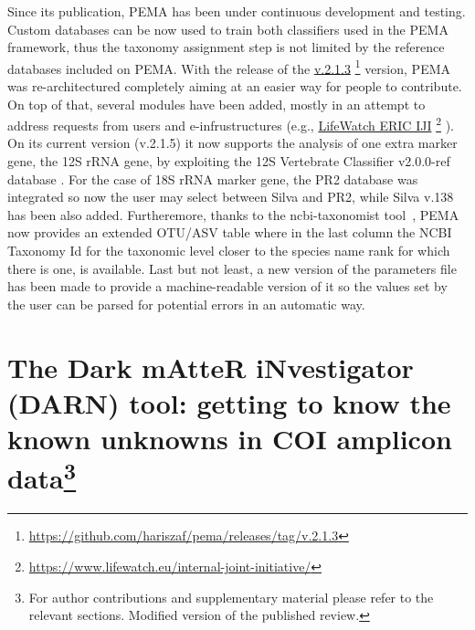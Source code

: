       Since its publication, PEMA has been under continuous development and testing.
      Custom databases can be now used to train both classifiers used in the PEMA framework, thus
      the taxonomy assignment step is not limited by the reference databases included on PEMA.
      With the release of the \href{https://github.com/hariszaf/pema/releases/tag/v.2.1.3}{v.2.1.3}
      \footnote{\href{https://github.com/hariszaf/pema/releases/tag/v.2.1.3}{https://github.com/hariszaf/pema/releases/tag/v.2.1.3}}
      version, PEMA was re-architectured completely aiming at an easier way for people to contribute. 
      On top of that, several modules have been added, mostly in an attempt to address requests from users and
      e-infrustructures (e.g., \href{https://www.lifewatch.eu/internal-joint-initiative/}{LifeWatch ERIC IJI}
      \footnote{\href{https://www.lifewatch.eu/internal-joint-initiative/}{https://www.lifewatch.eu/internal-joint-initiative/}}
      ). 
      On its current version (v.2.1.5) it now supports the analysis of one extra
      marker gene, the 12S rRNA gene, by exploiting the 12S Vertebrate Classifier v2.0.0-ref database \citep{teresita_m_porter_2021_5157047}.
      For the case of 18S rRNA marker gene, the PR2 database \citep{guillou2012protist} was integrated 
      so now the user may select between Silva and PR2,
      while Silva v.138 has been also added. 
      Furtheremore, thanks to the ncbi-taxonomist tool~\citep{buchmann2020collecting}, 
      PEMA now provides an extended OTU/ASV table where in the last column the NCBI Taxonomy Id 
      for the taxonomic level closer to the species name rank for which there is one, is available.
      Last but not least, a new version of the parameters file has been made to provide a machine-readable version 
      of it so the values set by the user can be parsed for potential errors in an automatic way. 


   \newpage


% 
% 

\newpage

\section[The Dark mAtteR iNvestigator (DARN) tool: getting to know the known unknowns in COI amplicon data]{
      The Dark mAtteR iNvestigator (DARN) tool: getting to know the known unknowns in COI amplicon data\footnote{
      For author contributions and supplementary material please refer to the relevant sections. 
      Modified version of the published review.
   }
}
\label{publ:darn}

